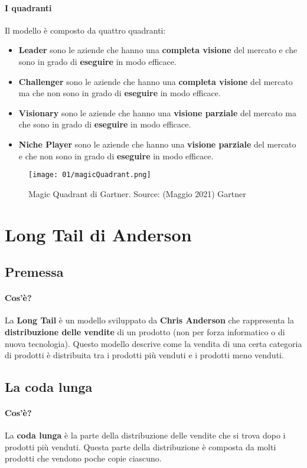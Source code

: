         \paragraph{I quadranti} Il modello è composto da quattro quadranti:
        \begin{itemize}
            \item \textbf{Leader} sono le aziende che hanno una \textbf{completa visione} del mercato e che sono in grado di \textbf{eseguire} in modo efficace.
            \item \textbf{Challenger} sono le aziende che hanno una \textbf{completa visione} del mercato ma che non sono in grado di \textbf{eseguire} in modo efficace.
            \item \textbf{Visionary} sono le aziende che hanno una \textbf{visione parziale} del mercato ma che sono in grado di \textbf{eseguire} in modo efficace.
            \item \textbf{Niche Player} sono le aziende che hanno una \textbf{visione parziale} del mercato e che non sono in grado di \textbf{eseguire} in modo efficace.
        \end{itemize}
        \begin{figure}[H]
            \centering
            \texttt{[image: 01/magicQuadrant.png]}
            \caption{Magic Quadrant di Gartner. Source: (Maggio 2021) Gartner}
        \end{figure}
\section{Long Tail di Anderson}
    \subsection{Premessa}
        \paragraph{Cos'è?} La \textbf{Long Tail} è un modello sviluppato da \textbf{Chris Anderson} che rappresenta la \textbf{distribuzione delle vendite} di un prodotto (non per forza informatico o di nuova tecnologia). Questo modello descrive come la vendita di una certa categoria di prodotti è distribuita tra i prodotti più venduti e i prodotti meno venduti.
    \subsection{La coda lunga}
        \paragraph{Cos'è?} La \textbf{coda lunga} è la parte della distribuzione delle vendite che si trova dopo i prodotti più venduti. Questa parte della distribuzione è composta da molti prodotti che vendono poche copie ciascuno.
